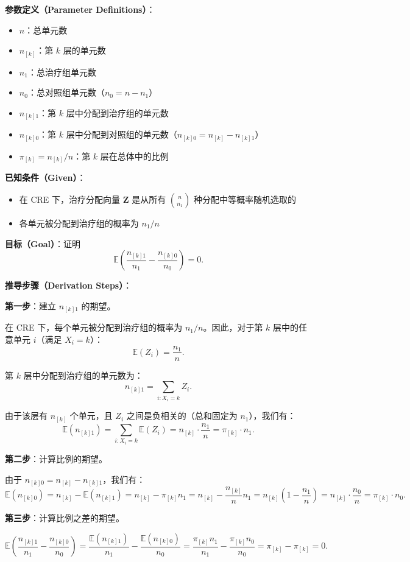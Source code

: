 \textbf{参数定义（Parameter Definitions）}：
\begin{itemize}
  \item $n$：总单元数
  \item $n_{[k]}$：第 $k$ 层的单元数
  \item $n_1$：总治疗组单元数
  \item $n_0$：总对照组单元数（$n_0 = n - n_1$）
  \item $n_{[k]1}$：第 $k$ 层中分配到治疗组的单元数
  \item $n_{[k]0}$：第 $k$ 层中分配到对照组的单元数（$n_{[k]0} = n_{[k]} - n_{[k]1}$）
  \item $\pi_{[k]} = n_{[k]}/n$：第 $k$ 层在总体中的比例
\end{itemize}

\textbf{已知条件（Given）}：
\begin{itemize}
  \item 在 CRE 下，治疗分配向量 $\mathbf{Z}$ 是从所有 $\binom{n}{n_1}$ 种分配中等概率随机选取的
  \item 各单元被分配到治疗组的概率为 $n_1/n$
\end{itemize}

\textbf{目标（Goal）}：证明
\[
\mathbb{E}\left( \frac{n_{[k]1}}{n_1} - \frac{n_{[k]0}}{n_0} \right) = 0.
\]

\textbf{推导步骤（Derivation Steps）}：

\textbf{第一步}：建立 $n_{[k]1}$ 的期望。

在 CRE 下，每个单元被分配到治疗组的概率为 $n_1/n$。因此，对于第 $k$ 层中的任意单元 $i$（满足 $X_i = k$）：
\[
\mathbb{E}(Z_i) = \frac{n_1}{n}.
\]

第 $k$ 层中分配到治疗组的单元数为：
\[
n_{[k]1} = \sum_{i: X_i = k} Z_i.
\]

由于该层有 $n_{[k]}$ 个单元，且 $Z_i$ 之间是负相关的（总和固定为 $n_1$），我们有：
\[
\mathbb{E}(n_{[k]1}) = \sum_{i: X_i = k} \mathbb{E}(Z_i) = n_{[k]} \cdot \frac{n_1}{n} = \pi_{[k]} \cdot n_1.
\]

\textbf{第二步}：计算比例的期望。

由于 $n_{[k]0} = n_{[k]} - n_{[k]1}$，我们有：
\[
\mathbb{E}(n_{[k]0}) = n_{[k]} - \mathbb{E}(n_{[k]1}) = n_{[k]} - \pi_{[k]} n_1 = n_{[k]} - \frac{n_{[k]}}{n} n_1 = n_{[k]} \left(1 - \frac{n_1}{n}\right) = n_{[k]} \cdot \frac{n_0}{n} = \pi_{[k]} \cdot n_0.
\]

\textbf{第三步}：计算比例之差的期望。

\[
\mathbb{E}\left( \frac{n_{[k]1}}{n_1} - \frac{n_{[k]0}}{n_0} \right) = \frac{\mathbb{E}(n_{[k]1})}{n_1} - \frac{\mathbb{E}(n_{[k]0})}{n_0} = \frac{\pi_{[k]} n_1}{n_1} - \frac{\pi_{[k]} n_0}{n_0} = \pi_{[k]} - \pi_{[k]} = 0.
\]

